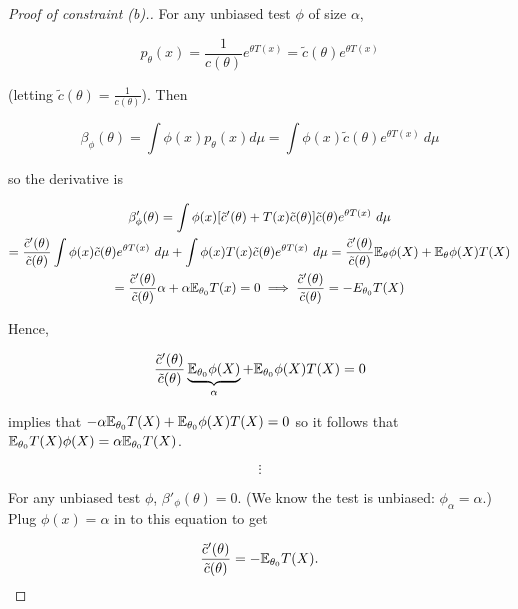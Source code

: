 \begin{proof}[Proof of constraint (b).]  For any unbiased test \(\phi\) of size \(\alpha\),



\[
p_\theta(x) = \frac{1}{c(\theta)} e^{\theta T(x)} = \tilde{c}(\theta)e^{\theta T(x)}
\]

(letting \( \tilde{c}(\theta) =  \frac{1}{c(\theta)}\)). Then 

\[
\beta_{\phi}(\theta) = \int \phi(x) p_\theta(x) d\mu = \int \phi(x) \tilde{c}(\theta) e^{\theta T(x)} \ d\mu
\]

so the derivative is

\begin{multline*}
\beta'_{\phi}(\theta) = \int \phi(x) [ \tilde{c}'(\theta) + T(x) \tilde{c}(\theta)] \tilde{c}(\theta) e^{\theta T(x)} \ d \mu
\\ = \frac{ \tilde{c}'(\theta)}{\tilde{c}(\theta)} \int \phi(x) \tilde{c}(\theta) e^{\theta T(x)} \ d\mu + \int \phi(x) T(x) \tilde{c}(\theta) e^{\theta T(x)} \ d \mu =  \frac{ \tilde{c}'(\theta)}{\tilde{c}(\theta)} \E_\theta \phi(X) + \E_\theta \phi(X) T(X)
\\ =  \frac{ \tilde{c}'(\theta)}{\tilde{c}(\theta)}  \alpha + \alpha \E_{\theta_0} T(x) = 0  \implies  \frac{ \tilde{c}'(\theta)}{\tilde{c}(\theta)}  = -E_{\theta_0} T(X)
\end{multline*}

Hence,

\[
 \frac{ \tilde{c}'(\theta)}{\tilde{c}(\theta)}  \underbrace{\E_{\theta_0}\phi(X)}_{\alpha} + \E_{\theta_0} \phi(X) T(X) = 0 
\]

implies that \(- \alpha \E_{\theta_0} T(X) + \E_{\theta_0} \phi(X) T(X) = 0 \) so it follows that \(\E_{\theta_0} T(X) \phi(X) = \alpha \E_{\theta_0} T(X)\). 

\[
\vdots
\]


For any unbiased test \(\phi\), \(\beta'_{\phi}(\theta) = 0\). (We know the test is unbiased: \(\phi_\alpha = \alpha\).) Plug \(\phi(x) = \alpha\) in to this equation to get 

\[
\frac{\tilde{c}'(\theta)}{\tilde{c}(\theta)} = -\E_{\theta_0} T(X).
\]

\end{proof}



